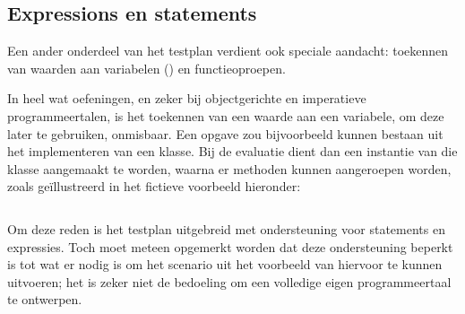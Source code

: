 \subsection{Expressions en statements}\label{subsec:expressions-and-statements}

Een ander onderdeel van het testplan verdient ook speciale aandacht: toekennen van waarden aan variabelen () en functieoproepen.

In heel wat oefeningen, en zeker bij objectgerichte en imperatieve programmeertalen, is het toekennen van een waarde aan een variabele, om deze later te gebruiken, onmisbaar.
Een opgave zou bijvoorbeeld kunnen bestaan uit het implementeren van een klasse.
Bij de evaluatie dient dan een instantie van die klasse aangemaakt te worden, waarna er methoden kunnen aangeroepen worden, zoals geïllustreerd in het fictieve voorbeeld hieronder:

\inputminted{java}{code/assignment.jshell}

Om deze reden is het testplan uitgebreid met ondersteuning voor statements en expressies.
Toch moet meteen opgemerkt worden dat deze ondersteuning beperkt is tot wat er nodig is om het scenario uit het voorbeeld van hiervoor te kunnen uitvoeren;
het is zeker niet de bedoeling om een volledige eigen programmeertaal te ontwerpen.

